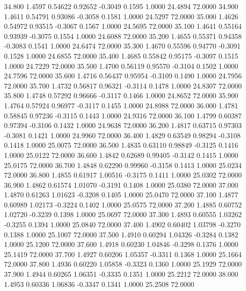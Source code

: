   34.800   1.4597   0.54622   0.92652  -0.3049   0.1595   1.0000  24.4894  72.0000
  34.900   1.4611   0.54791   0.93086  -0.3058   0.1581   1.0000  24.5297  72.0000
  35.000   1.4626   0.54972   0.93515  -0.3067   0.1567   1.0000  24.5695  72.0000
  35.100   1.4641   0.55164   0.93939  -0.3075   0.1554   1.0000  24.6088  72.0000
  35.200   1.4655   0.55371   0.94358  -0.3083   0.1541   1.0000  24.6474  72.0000
  35.300   1.4670   0.55596   0.94770  -0.3091   0.1528   1.0000  24.6855  72.0000
  35.400   1.4685   0.55842   0.95175  -0.3097   0.1515   1.0000  24.7229  72.0000
  35.500   1.4700   0.56119   0.95570  -0.3104   0.1502   1.0000  24.7596  72.0000
  35.600   1.4716   0.56437   0.95954  -0.3109   0.1490   1.0000  24.7956  72.0000
  35.700   1.4732   0.56817   0.96321  -0.3114   0.1478   1.0000  24.8307  72.0000
  35.800   1.4748   0.57292   0.96666  -0.3117   0.1466   1.0000  24.8652  72.0000
  35.900   1.4764   0.57924   0.96977  -0.3117   0.1455   1.0000  24.8988  72.0000
  36.000   1.4781   0.58845   0.97236  -0.3115   0.1443   1.0000  24.9316  72.0000
  36.100   1.4799   0.60387   0.97394  -0.3106   0.1432   1.0000  24.9638  72.0000
  36.200   1.4817   0.63715   0.97303  -0.3081   0.1421   1.0000  24.9960  72.0000
  36.400   1.4829   0.63549   0.98294  -0.3108   0.1418   1.0000  25.0075  72.0000
  36.500   1.4835   0.63110   0.98849  -0.3125   0.1416   1.0000  25.0122  72.0000
  36.600   1.4842   0.62689   0.99405  -0.3142   0.1415   1.0000  25.0175  72.0000
  36.700   1.4848   0.62290   0.99960  -0.3158   0.1413   1.0000  25.0234  72.0000
  36.800   1.4855   0.61917   1.00516  -0.3175   0.1411   1.0000  25.0302  72.0000
  36.900   1.4862   0.61574   1.01070  -0.3191   0.1408   1.0000  25.0380  72.0000
  37.000   1.4870   0.61263   1.01623  -0.3208   0.1405   1.0000  25.0470  72.0000
  37.100   1.4877   0.60989   1.02173  -0.3224   0.1402   1.0000  25.0575  72.0000
  37.200   1.4885   0.60752   1.02720  -0.3239   0.1398   1.0000  25.0697  72.0000
  37.300   1.4893   0.60555   1.03262  -0.3255   0.1394   1.0000  25.0840  72.0000
  37.400   1.4902   0.60402   1.03798  -0.3270   0.1388   1.0000  25.1007  72.0000
  37.500   1.4910   0.60294   1.04326  -0.3284   0.1382   1.0000  25.1200  72.0000
  37.600   1.4918   0.60230   1.04846  -0.3298   0.1376   1.0000  25.1419  72.0000
  37.700   1.4927   0.60206   1.05357  -0.3311   0.1368   1.0000  25.1664  72.0000
  37.800   1.4936   0.60220   1.05858  -0.3323   0.1360   1.0000  25.1929  72.0000
  37.900   1.4944   0.60265   1.06351  -0.3335   0.1351   1.0000  25.2212  72.0000
  38.000   1.4953   0.60336   1.06836  -0.3347   0.1341   1.0000  25.2508  72.0000
